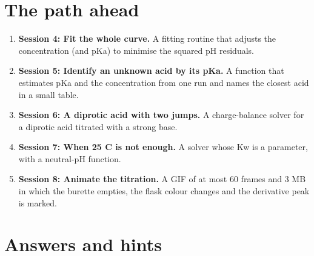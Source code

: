 \documentclass[11pt,a4paper]{article}
\begin{document}
\section{The path ahead}
\begin{enumerate}[nosep]
\item \textbf{Session 4: Fit the whole curve.} A fitting routine that adjusts the concentration (and pKa) to minimise the squared pH residuals.
\item \textbf{Session 5: Identify an unknown acid by its pKa.} A function that estimates pKa and the concentration from one run and names the closest acid in a small table.
\item \textbf{Session 6: A diprotic acid with two jumps.} A charge-balance solver for a diprotic acid titrated with a strong base.
\item \textbf{Session 7: When 25 C is not enough.} A solver whose Kw is a parameter, with a neutral-pH function.
\item \textbf{Session 8: Animate the titration.} A GIF of at most 60 frames and 3 MB in which the burette empties, the flask colour changes and the derivative peak is marked.
\end{enumerate}

\section{Answers and hints}
\end{document}
